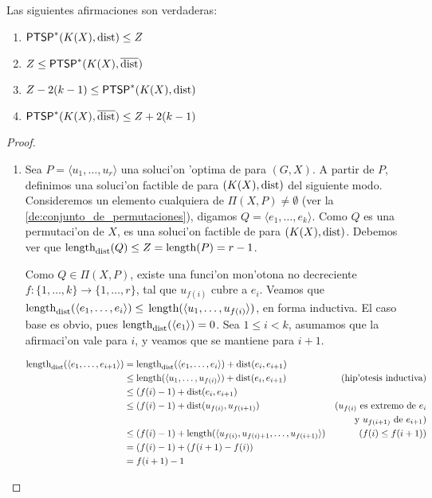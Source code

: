 \begin{theorem}
\label{th:clients_bounds}
Las siguientes afirmaciones son verdaderas:
\begin{enumerate}
\item $\textnormal{\textsf{PTSP}}^*(K(X), \textnormal{dist}) \leq Z$
\item $Z \leq \textnormal{\textsf{PTSP}}^*(K(X), \overline{\textnormal{dist}})$
\item $Z - 2(k - 1) \leq \textnormal{\textsf{PTSP}}^*(K(X), \textnormal{dist})$
\item $\textnormal{\textsf{PTSP}}^*(K(X), \overline{\textnormal{dist}}) \leq Z + 2(k - 1)$
\end{enumerate}

\begin{proof}
\hfill
\begin{enumerate}
\item Sea $P = \langle u_1, \dots, u_r \rangle$ una soluci'on 'optima de  para $(G, X)$. A partir de $P$, definimos una soluci'on factible de  para $(K(X), \textnormal{dist})$ del siguiente modo. Consideremos un elemento cualquiera de $\Pi(X, P) \neq \emptyset$ (ver la \autoref{de:conjunto_de_permutaciones}), digamos $Q = \langle e_1, \dots, e_k \rangle$. Como $Q$ es una permutaci'on de $X$, es una soluci'on factible de  para $(K(X), \textnormal{dist})$. Debemos ver que $\textnormal{length}_{\textnormal{dist}}(Q) \leq Z = \textnormal{length}(P) = r - 1$.

Como $Q \in \Pi(X, P)$, existe una funci'on mon'otona no decreciente $f: \{1, \dots, k\} \to \{1, \dots, r\}$, tal que $u_{f(i)}$ cubre a $e_i$. Veamos que $\textnormal{length}_{\textnormal{dist}}(\langle e_1, \dots, e_i \rangle) \leq$ $\textnormal{length}(\langle u_1, \dots, u_{f(i)} \rangle)$, en forma inductiva. El caso base es obvio, pues $\textnormal{length}_{\textnormal{dist}}(\langle e_1 \rangle) = 0$. Sea $1 \leq i < k$, asumamos que la afirmaci'on vale para $i$, y veamos que se mantiene para $i + 1$.

\begin{align*}
\textnormal{length}_{\textnormal{dist}}(\langle e_1, \dots, e_{i + 1} \rangle) &= \textnormal{length}_{\textnormal{dist}}(\langle e_1, \dots, e_i \rangle) + \textnormal{dist}(e_i, e_{i + 1}) &\\
&\leq \textnormal{length}(\langle u_1, \dots, u_{f(i)} \rangle) + \textnormal{dist}(e_i, e_{i + 1}) & \text{(hip'otesis inductiva)}\\
&\leq (f(i) - 1) + \textnormal{dist}(e_i, e_{i + 1}) &\\
&\leq (f(i) - 1) + \textnormal{dist}(u_{f(i)}, u_{f(i + 1)}) & \text{(} u_{f(i)} \text{ es extremo de } e_i \\
& & \text{y } u_{f(i + 1)} \text{ de } e_{i + 1} \text{)}\\
&\leq (f(i) - 1) + \textnormal{length}(\langle u_{f(i)}, u_{f(i) + 1}, \dots, u_{f(i + 1)}\rangle) & \text{(} f(i) \leq f(i + 1) \text{)}\\
&= (f(i) - 1) + (f(i + 1) - f(i)) &\\
&= f(i + 1) - 1 &
\end{align*}


\end{enumerate}
\end{proof}
\end{theorem}
